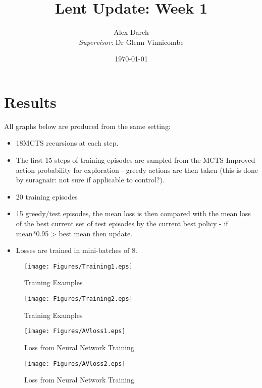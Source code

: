 \documentclass[11.7pt]{article}
\author{Alex Darch \\
   \textit{Supervisor:} Dr Glenn Vinnicombe}
\title{Lent Update: Week 1}
\date{\today}
\begin{document}
%

\maketitle

\section{Results}

All graphs below are produced from the same setting:
\begin{itemize}
   \item 18MCTS recursions at each step. 
   \item The first 15 steps of training episodes are sampled from the MCTS-Improved action probability for exploration - greedy actions are then taken (this is done by suragnair: not sure if applicable to control?). 
   \item 20 training episodes
   \item 15 greedy/test episodes, the mean loss is then compared with the mean loss of the best current set of test episodes by the current best policy - if mean*0.95 > best mean then update.
   \item Losses are trained in mini-batches of 8. 
\end{itemize}

\begin{figure}[ht]
   \begin{minipage}[b]{0.48\linewidth}
      \centering
      \texttt{[image: Figures/Training1.eps]}
      \caption{Training Examples}
      \label{fig:figure1}
   \end{minipage}
   \hspace{0.2cm}
   \begin{minipage}[b]{0.48\linewidth}
      \centering
      \texttt{[image: Figures/Training2.eps]}
      \caption{Training Examples}
      \label{fig:figure2}
   \end{minipage}
\end{figure}

\begin{figure}[ht]
   \begin{minipage}[b]{0.48\linewidth}
      \centering
      \texttt{[image: Figures/AVloss1.eps]}
      \caption{Loss from Neural Network Training}
      \label{fig:figure1}
   \end{minipage}
   \hspace{0.2cm}
   \begin{minipage}[b]{0.48\linewidth}
      \centering
      \texttt{[image: Figures/AVloss2.eps]}
      \caption{Loss from Neural Network Training}
      \label{fig:figure2}
   \end{minipage}
\end{figure}
\end{document}
